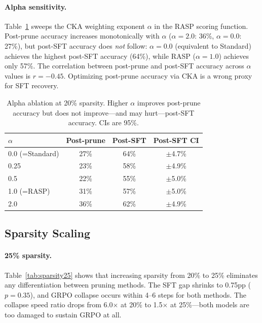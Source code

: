 \documentclass[11pt,a4paper]{article}
\begin{document}
\paragraph{Alpha sensitivity.} Table~\ref{tab:alpha} sweeps the CKA weighting exponent $\alpha$ in the RASP scoring function. Post-prune accuracy increases monotonically with $\alpha$ ($\alpha=2.0$: 36\%, $\alpha=0.0$: 27\%), but post-SFT accuracy does \emph{not} follow: $\alpha=0.0$ (equivalent to Standard) achieves the highest post-SFT accuracy (64\%), while RASP ($\alpha=1.0$) achieves only 57\%. The correlation between post-prune and post-SFT accuracy across $\alpha$ values is $r=-0.45$. Optimizing post-prune accuracy via CKA is a wrong proxy for SFT recovery.

\begin{table}[t]
\centering
\small
\caption{Alpha ablation at 20\% sparsity. Higher $\alpha$ improves post-prune accuracy but does not improve---and may hurt---post-SFT accuracy. CIs are 95\%.}
\label{tab:alpha}
\begin{tabular}{lccc}
\toprule
$\alpha$ & \textbf{Post-prune} & \textbf{Post-SFT} & \textbf{Post-SFT CI} \\
\midrule
0.0 (=Standard) & 27\% & 64\% & $\pm$4.7\% \\
0.25 & 23\% & 58\% & $\pm$4.9\% \\
0.5 & 22\% & 55\% & $\pm$5.0\% \\
1.0 (=RASP) & 31\% & 57\% & $\pm$5.0\% \\
2.0 & 36\% & 62\% & $\pm$4.9\% \\
\bottomrule
\end{tabular}
\end{table}

\subsection{Sparsity Scaling}
\label{sec:sparsity}

\paragraph{25\% sparsity.} Table~\ref{tab:sparsity25} shows that increasing sparsity from 20\% to 25\% eliminates any differentiation between pruning methods. The SFT gap shrinks to 0.75pp ($p=0.35$), and GRPO collapse occurs within 4--6 steps for both methods. The collapse speed ratio drops from 6.0$\times$ at 20\% to 1.5$\times$ at 25\%---both models are too damaged to sustain GRPO at all.
\end{document}
